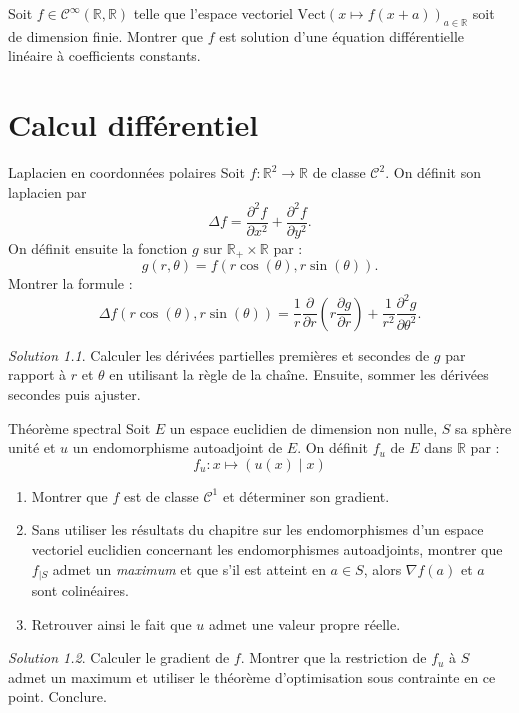 \documentclass[french]{book}
\newcommand{\R}{\mathbb{R}}
\theoremstyle{definition}
\theoremstyle{remark}
\newtheorem*{sol}{Solution}
\begin{document}
\begin{exo}[3]{}
	Soit $f\in\mathcal{C}^\infty(\R,\R)$ telle que l'espace vectoriel $\text{Vect}(x\mapsto f(x+a))_{a\in\R}$ soit de dimension finie. Montrer que $f$ est solution d'une équation différentielle linéaire à coefficients constants.
\end{exo}

\chapter{Calcul différentiel}

\begin{exo}[0]{Laplacien en coordonnées polaires}
	Soit $f:\R^2\to\R$ de classe $\mathcal{C}^2$. On définit son laplacien par $$\Delta f=\frac{\partial^2 f}{\partial x^2}+\frac{\partial^2 f}{\partial y^2}.$$ On définit ensuite la fonction $g$ sur $\R_+\times\R$ par : $$g(r,\theta)=f(r\cos(\theta),r\sin(\theta)).$$ Montrer la formule : $$\Delta f(r\cos(\theta),r\sin(\theta))=\frac{1}{r}\frac{\partial}{\partial r}\left(r\frac{\partial g}{\partial r}\right)+\frac{1}{r^2}\frac{\partial^2 g}{\partial\theta^2}.$$
\end{exo}
\begin{sol}
	Calculer les dérivées partielles premières et secondes de $g$ par rapport à $r$ et $\theta$ en utilisant la règle de la chaîne. Ensuite, sommer les dérivées secondes puis ajuster.
\end{sol}

\begin{exo}[0]{Théorème spectral}
	Soit $E$ un espace euclidien de dimension non nulle, $S$ sa sphère unité et $u$ un endomorphisme autoadjoint de $E$. On définit $f_u$ de $E$ dans $\R$ par : $$f_u:x\mapsto (u(x)\mid x)$$
	\begin{enumerate}
		\item Montrer que $f$ est de classe $\mathcal{C}^1$ et déterminer son gradient.
		\item Sans utiliser les résultats du chapitre sur les endomorphismes d'un espace vectoriel euclidien concernant les endomorphismes autoadjoints, montrer que $f_{\mid S}$ admet un \textit{maximum} et que s'il est atteint en $a\in S$, alors $\nabla f(a)$ et $a$ sont colinéaires.
		\item Retrouver ainsi le fait que $u$ admet une valeur propre réelle.
	\end{enumerate}
\end{exo}
\begin{sol}
	Calculer le gradient de $f$. Montrer que la restriction de $f_u$ à $S$ admet un maximum et utiliser le théorème d'optimisation sous contrainte en ce point. Conclure. 
\end{sol}
\end{document}
